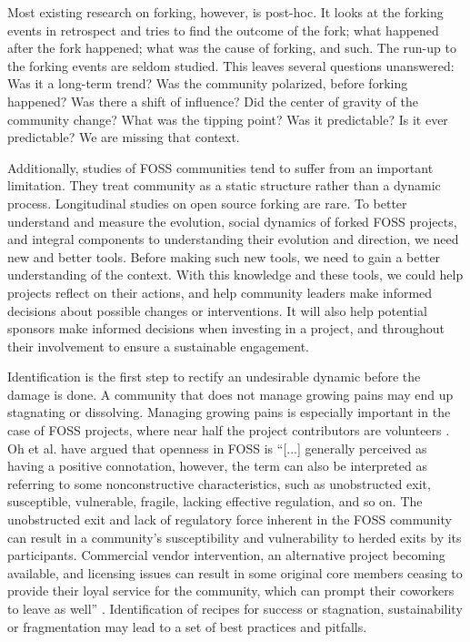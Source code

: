 \documentclass[11pt]{report}
\begin{document}
Most existing research on forking, however, is post-hoc. It looks at the forking events in retrospect and tries to find the outcome of the fork; what happened after the fork happened; what was the cause of forking, and such. The run-up to the forking events are seldom studied. This leaves several questions unanswered: Was it a long-term trend? Was the community polarized, before forking happened? Was there a shift of influence? Did the center of gravity of the community change? What was the tipping point? Was it predictable? Is it ever predictable? We are missing that context. 

Additionally, studies of FOSS communities tend to suffer from an important limitation. They treat community as a static structure rather than a dynamic process. Longitudinal studies on open source forking are rare. To better understand and measure the evolution, social dynamics of forked FOSS projects, and integral components to understanding their evolution and direction, we need new and better tools. Before making such new tools, we need to gain a better understanding of the context. With this knowledge and these tools, we could help projects reflect on their actions, and help community leaders make informed decisions about possible changes or interventions. It will also help potential sponsors make informed decisions when investing in a project, and throughout their involvement to ensure a sustainable engagement. 

Identification is the first step to rectify an undesirable dynamic before the damage is done. A community that does not manage growing pains may end up stagnating or dissolving. Managing growing pains is especially important in the case of FOSS projects, where near half the project contributors are volunteers \cite{Forrest}. Oh et al. \cite{Oh} have argued that openness in FOSS is ``[...] generally perceived as having a positive connotation, however, the term can also be interpreted as referring to some nonconstructive characteristics, such as unobstructed exit, susceptible, vulnerable, fragile, lacking effective regulation, and so on. The unobstructed exit and lack of regulatory force inherent in the FOSS community can result in a community's susceptibility and vulnerability to herded exits by its participants. Commercial vendor intervention, an alternative project becoming available, and licensing issues can result in some original core members ceasing to provide their loyal service for the community, which can prompt their coworkers to leave as well'' \cite{Oh}. Identification of recipes for success or stagnation, sustainability or fragmentation may lead to a set of best practices and pitfalls.\\
\end{document}
